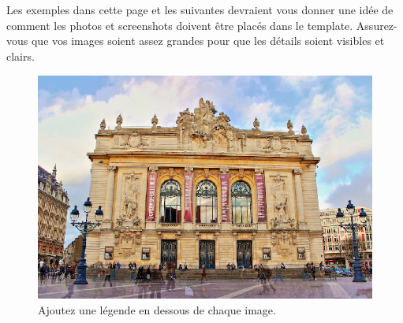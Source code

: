 \documentclass{chi-ext}
\begin{document}

Les exemples dans cette page et les suivantes devraient vous donner une idée de comment les photos et screenshots doivent être placés dans le template. 
Assurez-vous que vos images soient assez grandes pour que les détails soient visibles et clairs.

\begin{figure}
  \centering
  \includegraphics[width=\linewidth]{images/lille.eps}
  \caption{Ajoutez une légende en dessous de chaque image.}
  \label{fig:sample}
\end{figure}
\end{document}
